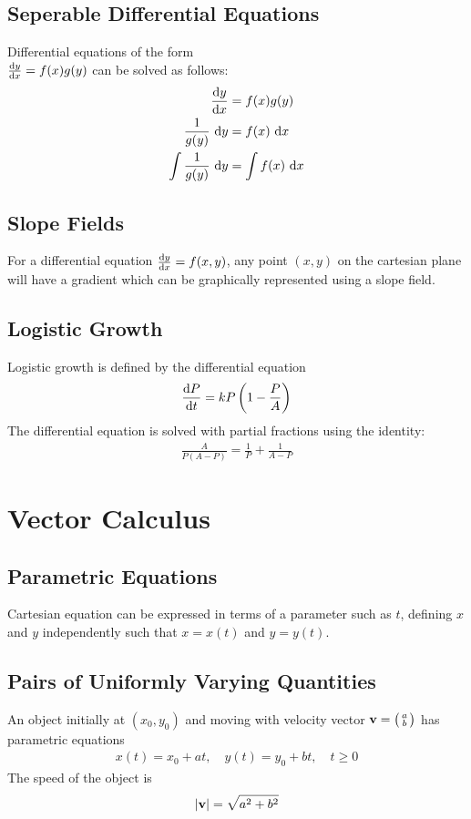 \documentclass[10pt, a4paper, titlepage]{article}
\begin{document}
\begin{multicols*}{3}
	\dotfill
	\subsection{Seperable Differential Equations}
	Differential equations of the form \\$\dv{y}{x}=f(x)g(y)$ can be solved as follows:
	\begin{align}
		\dv{y}{x}&=f(x)g(y)\\
		\frac{1}{g(y)}\, \dd{y}&=f(x)\, \dd{x}\\
		\int \frac{1}{g(y)}\, \dd{y}&=\int f(x)\, \dd{x}
	\end{align}

	\dotfill
	\subsection{Slope Fields}
	For a differential equation $\dv{y}{x}=f(x,y)$, any point $(x,y)$ on the cartesian plane will have a gradient which can be graphically represented using a slope field.

	\dotfill
	\subsection{Logistic Growth}
	Logistic growth is defined by the differential equation
	\begin{align}
		\dv{P}{t}=kP\left(1-\frac{P}{A}\right)
	\end{align}
	The differential equation is solved with partial fractions using the identity:
	\begin{align}
		\frac{A}{P(A-P)}=\frac{1}{P}+\frac{1}{A-P}
	\end{align}
	
	\hrulefill

	\section{Vector Calculus}
	\subsection{Parametric Equations}
	Cartesian equation can be expressed in terms of a parameter such as $t$, defining $x$ and $y$ independently such that $x=x(t)$ and $y=y(t)$.

	\dotfill
	\subsection{Pairs of Uniformly Varying Quantities}
	An object initially at $(x_0,y_0)$ and moving with velocity vector $\vb{v}=\big(\begin{smallmatrix}a \\b \end{smallmatrix}\big)$ has parametric equations
	\begin{align}
		x(t)=x_0+at,\quad y(t)=y_0+bt,\quad t\geq 0
	\end{align}
	The speed of the object is
	\begin{align}
		|\vb{v}|=\sqrt{a^2+b^2}
	\end{align}


\end{multicols*}
\end{document}
